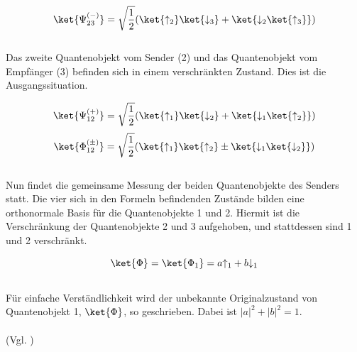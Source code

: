 \[ \ket{\Psi_{23}^{(-)}} = \sqrt{\frac{1}{2}} (\ket{\uparrow_2}\ket{\downarrow_3} + \ket{{\downarrow_2}\ket{\uparrow_3}}) \]
\\
Das zweite Quantenobjekt vom Sender (2) und das Quantenobjekt vom Empfänger (3) befinden sich in einem verschränkten Zustand. Dies ist die Ausgangssituation.

\[ \ket{\Psi_{12}^{(+)}} = \sqrt{\frac{1}{2}} (\ket{\uparrow_1}\ket{\downarrow_2} + \ket{{\downarrow_1}\ket{\uparrow_2}}) \]
\[ \ket{\Phi_{12}^{(\pm)}} = \sqrt{\frac{1}{2}} (\ket{\uparrow_1}\ket{\uparrow_2} \pm \ket{{\downarrow_1}\ket{\downarrow_2}}) \]
\\
Nun findet die gemeinsame Messung der beiden Quantenobjekte des Senders statt. Die vier sich in den Formeln befindenden Zustände bilden eine orthonormale Basis für die Quantenobjekte 1 und 2. Hiermit ist die Verschränkung der Quantenobjekte 2 und 3 aufgehoben, und stattdessen sind 1 und 2 verschränkt.

\[ \ket{\Phi} = \ket{\Phi_1} = a{\uparrow_1} + b{\downarrow_1} \]
\\
Für einfache Verständlichkeit wird der unbekannte Originalzustand von Quantenobjekt 1, \(\ket{\Phi}\), so geschrieben. Dabei ist \(|a|^2 + |b|^2 = 1\).\\
\\
(Vgl. \cite[S.2]{bennett_teleporting_1993})

